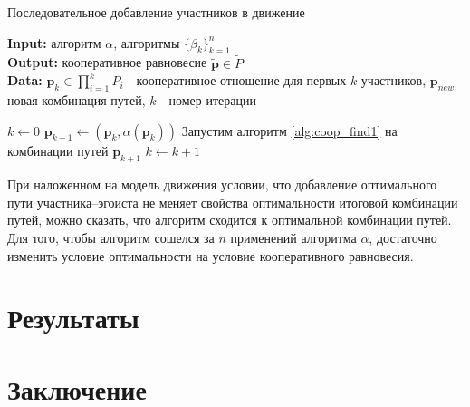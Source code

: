 \documentclass[12pt, a4paper]{article}
\begin{document}
\begin{algorithm}[H]
	\caption{Последовательное добавление участников в движение}
	\label{alg:coop_find2}
	{\bf {Input:}} алгоритм $\alpha$, алгоритмы $\{\beta_k\}_{k = 1}^n$\\
	{\bf {Output:}} кооперативное равновесие $\widetilde{\textbf{p}} \in \widetilde{P}$\\
	{\bf {Data:}} $\textbf{p}_{k} \in \prod\limits_{i = 1}^kP_i$ - кооперативное отношение для первых $k$ участников, $\textbf{p}_{new}$ - новая комбинация путей, $k$ - номер итерации
	\begin{algorithmic}[1]
		\State $k \gets 0$
		\State $\textbf{p}_{k + 1} \gets (\textbf{p}_{k}, \alpha (\textbf{p}_{k}))$
		\State Запустим алгоритм \ref {alg:coop_find1} на комбинации путей $\textbf{p}_{k + 1}$
		\State $k \gets k + 1$
		\EndWhile
	\end{algorithmic}
\end{algorithm}

При наложенном на модель движения условии, что добавление оптимального пути участника--эгоиста не меняет свойства оптимальности итоговой комбинации путей, можно сказать, что алгоритм сходится к оптимальной комбинации путей. Для того, чтобы алгоритм сошелся за $n$ применений алгоритма $\alpha$, достаточно изменить условие оптимальности на условие кооперативного равновесия.


\newpage
\section{Результаты}

\newpage
\section{Заключение}
\end{document}
